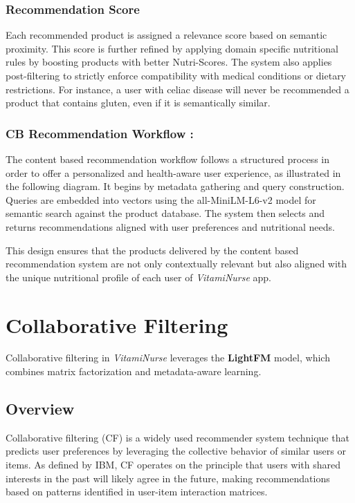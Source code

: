 \subsubsection{Recommendation Score}
\par Each recommended product is assigned a relevance score based on semantic proximity. This score is further refined by applying domain specific nutritional rules by boosting products with better Nutri-Scores. The system also applies post-filtering to strictly enforce compatibility with medical conditions or dietary restrictions. For instance, a user with celiac disease will never be recommended a product that contains gluten, even if it is semantically similar.

\subsubsection{CB Recommendation Workflow :}
The content based recommendation workflow follows a structured process in order to offer a personalized and health-aware user experience, as illustrated in the following diagram. It begins by metadata gathering and query construction. Queries are embedded into vectors using the all-MiniLM-L6-v2 model for semantic search against the product database. The system then selects and returns recommendations aligned with user preferences and nutritional needs.


\apr This design ensures that the products delivered by the content based recommendation system are not only contextually relevant but also aligned with the unique nutritional profile of each user of \textit{VitamiNurse} app.

\newpage
\section{Collaborative Filtering}
Collaborative filtering in \textit{VitamiNurse} leverages the \textbf{LightFM} model, which combines matrix factorization and metadata-aware learning. 
\subsection{Overview}

Collaborative filtering (CF) is a widely used recommender system technique that predicts user preferences by leveraging the collective behavior of similar users or items. As defined by IBM, CF operates on the principle that users with shared interests in the past will likely agree in the future, making recommendations based on patterns identified in user-item interaction matrices\cite{ibm-cf}.

